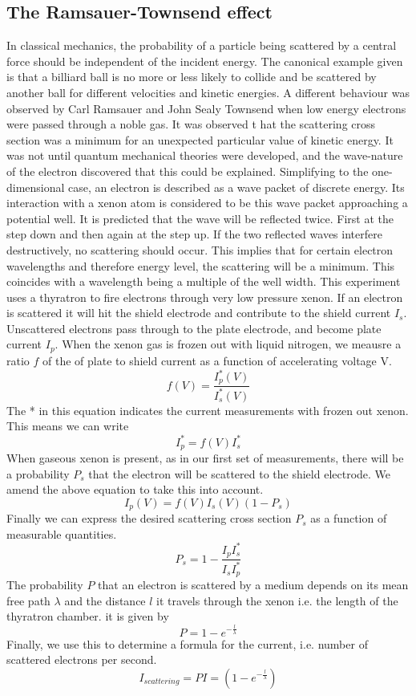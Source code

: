 \documentclass{article}
\begin{document}
\subsection*{The Ramsauer-Townsend effect}
In classical mechanics, the probability of a particle being scattered by a central force should be independent of the incident energy. The canonical example given is that a billiard ball is no more or less likely to collide and be scattered by another ball for different velocities and kinetic energies. A different behaviour was observed by Carl Ramsauer and John Sealy Townsend when low energy electrons were passed through a noble gas. It was observed t  hat the scattering cross section was a minimum for an unexpected particular value of kinetic energy. It was not until quantum mechanical theories were developed, and the wave-nature of the electron discovered that this could be explained. Simplifying to the one-dimensional case, an electron is described as a wave packet of discrete energy. Its interaction with a xenon atom is considered to be this wave packet approaching a potential well. It is predicted that the wave will be reflected twice. First at the step down and then again at the step up. If the two reflected waves interfere destructively, no scattering should occur. This implies that for certain electron wavelengths and therefore energy level, the scattering will be a minimum. This coincides with a wavelength being a multiple of the well width. This experiment uses a thyratron to fire electrons through very low pressure xenon. If an electron is scattered it will hit the shield electrode and contribute to the shield current $I_s$. Unscattered electrons pass through to the plate electrode, and become plate current $I_p$. When the xenon gas is frozen out with liquid nitrogen, we meausre a ratio $f$ of the of plate to shield current as a function of accelerating voltage V. 
\[f(V) = \frac{I_p^*(V)}{I_s^*(V)}\]
The * in this equation indicates the current measurements with frozen out xenon. This means we can write 
\[I_p^* = f(V)I_s^*\]
When gaseous xenon is present, as in our first set of measurements, there will be a probability $P_s$ that the electron will be scattered to the shield electrode. We amend the above equation to take this into account.
\[I_p(V) = f(V)I_s(V)(1-P_s)\]
Finally we can express the desired scattering cross section $P_s$ as a function of measurable quantities.
\begin{equation}
    P_s = 1 - \frac{I_pI_s^*}{I_sI_p^*}
\end{equation}
The probability $P$ that an electron is scattered by a medium depends on its mean free path $\lambda$ and the distance $l$ it travels through the xenon i.e. the length of the thyratron chamber. it is given by
\[P = 1-e^{-\frac{l}{\lambda}}\]
Finally, we use this to determine a formula for the current, i.e. number of scattered electrons per second. 
\begin{equation}
    I_{scattering} = PI = (1-e^{-\frac{l}{\lambda}})
\end{equation}
\end{document}
